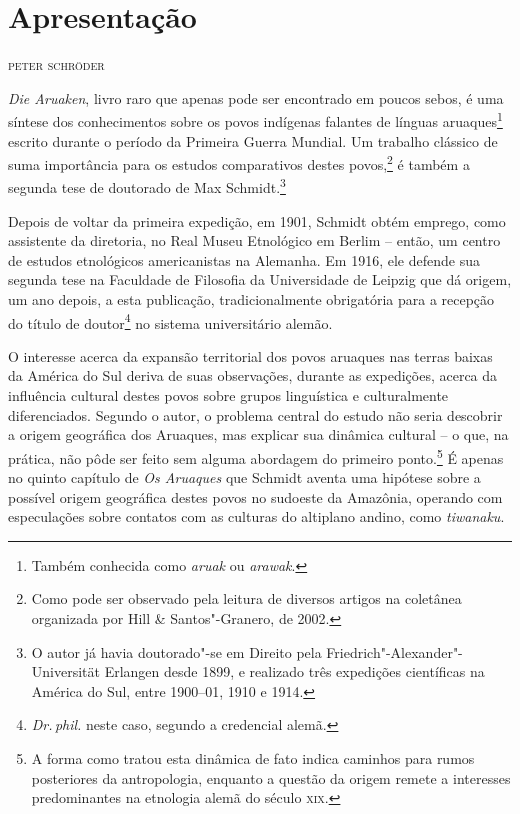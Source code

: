 \pagestyle{plain}

\newcommand{\subtitulo}[1]{\NoCaseChange{\textnormal{\break\Large\itshape#1}}}
\chapter*{Apresentação\smallskip\subtitulo{Um clássico da etnologia\\ sul-americanista}}


\begin{flushright}
\textsc{peter schröder}\medskip
\end{flushright}

\noindent{}\textit{Die Aruaken}, livro raro que apenas pode ser encontrado em poucos sebos, é uma síntese dos conhecimentos sobre os povos indígenas falantes de línguas aruaques\footnote{Também conhecida como \textit{aruak} ou \textit{arawak}.} escrito durante o período da Primeira Guerra Mundial. Um trabalho clássico de suma importância para os estudos comparativos destes povos,\footnote{Como pode ser observado pela leitura de diversos artigos na coletânea organizada por Hill \& Santos"-Granero, de 2002.} é também a segunda tese de doutorado de Max Schmidt.\footnote{O autor já havia doutorado"-se em Direito pela Friedrich"-Alexander"-Universität Erlangen desde 1899, e realizado três expedições científicas na América do Sul, entre 1900--01, 1910 e 1914.}

Depois de voltar da primeira expedição, em 1901, Schmidt obtém emprego, como assistente da diretoria, no Real Museu Etnológico em Berlim -- então, um centro de estudos etnológicos americanistas na Alemanha. Em 1916, ele defende sua segunda tese na Faculdade de Filosofia da Universidade de Leipzig que dá origem, um ano depois, a esta publicação, tradicionalmente obrigatória para a recepção do título de doutor\footnote{\textit{Dr.\,phil.} neste caso, segundo a credencial alemã.} no sistema universitário alemão.

O interesse acerca da expansão territorial dos povos aruaques nas terras baixas da América do Sul deriva de suas observações, durante as expedições, acerca da influência cultural destes povos sobre grupos linguística e culturalmente diferenciados. Segundo o autor, o problema central do estudo não seria descobrir a origem geográfica dos Aruaques, mas explicar sua dinâmica cultural -- o que, na prática, não pôde ser feito sem alguma abordagem do primeiro ponto.\footnote{A forma como tratou esta dinâmica de fato indica caminhos para rumos posteriores da antropologia, enquanto a questão da origem remete a interesses predominantes na etnologia alemã do século \textsc{xix}.} É apenas no quinto capítulo de \textit{Os Aruaques} que Schmidt aventa uma hipótese sobre a possível origem geográfica destes povos no sudoeste da Amazônia, operando com especulações sobre contatos com as culturas do altiplano andino, como \textit{tiwanaku}.

